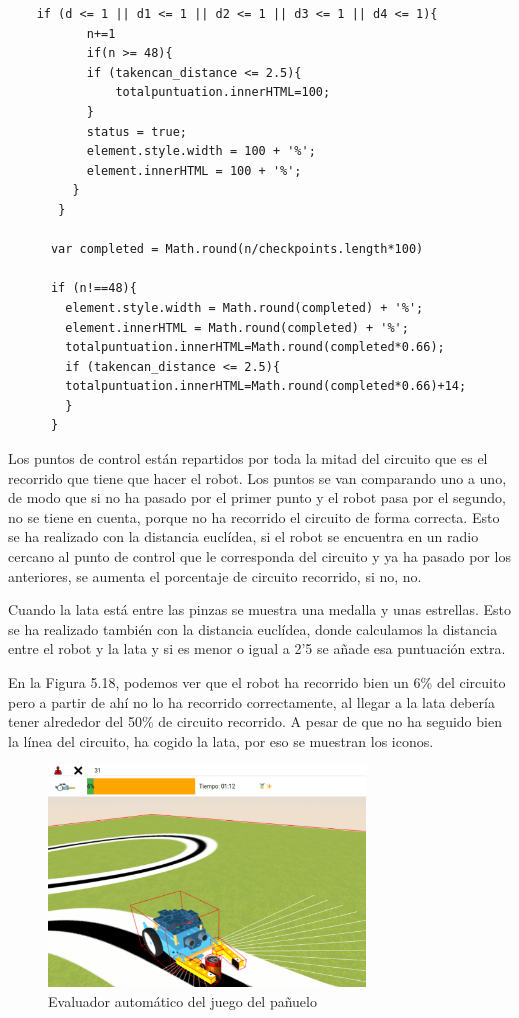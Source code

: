 \begin{lstlisting}
	if (d <= 1 || d1 <= 1 || d2 <= 1 || d3 <= 1 || d4 <= 1){
	       n+=1
	       if(n >= 48){
		   if (takencan_distance <= 2.5){
		       totalpuntuation.innerHTML=100;
		   }
		   status = true;
		   element.style.width = 100 + '%';
		   element.innerHTML = 100 + '%';
	     }
	   }
	  
	  var completed = Math.round(n/checkpoints.length*100)
	  
	  if (n!==48){
	    element.style.width = Math.round(completed) + '%';
	    element.innerHTML = Math.round(completed) + '%';
	    totalpuntuation.innerHTML=Math.round(completed*0.66);
	    if (takencan_distance <= 2.5){
		totalpuntuation.innerHTML=Math.round(completed*0.66)+14;
	    }
	  }
\end{lstlisting}

Los puntos de control están repartidos por toda la mitad del circuito que es el recorrido que tiene que hacer el robot. Los puntos se van comparando uno a uno, de modo que si no ha pasado por el primer punto y el robot pasa por el segundo, no se tiene en cuenta, porque no ha recorrido el circuito de forma correcta. Esto se ha realizado con la distancia euclídea, si el robot se encuentra en un radio cercano al punto de control que le corresponda del circuito y ya ha pasado por los anteriores, se aumenta el porcentaje de circuito recorrido, si no, no.

Cuando la lata está entre las pinzas se muestra una medalla y unas estrellas. Esto se ha realizado también con la distancia euclídea, donde calculamos la distancia entre el robot y la lata y si es menor o igual a 2'5 se añade esa puntuación extra.

En la Figura 5.18, podemos ver que el robot ha recorrido bien un 6\% del circuito pero a partir de ahí no lo ha recorrido correctamente, al llegar a la lata debería tener alrededor del  50\% de circuito recorrido. A pesar de que no ha seguido bien la línea del circuito, ha cogido la lata, por eso se muestran los iconos.

 \begin{figure}[H]
  \centering
 \includegraphics[width=0.75\textwidth, height=0.45\textwidth]{chapters/images/evaluadorpinza.png}
  \caption{Evaluador automático del juego del pañuelo}
\end{figure}


